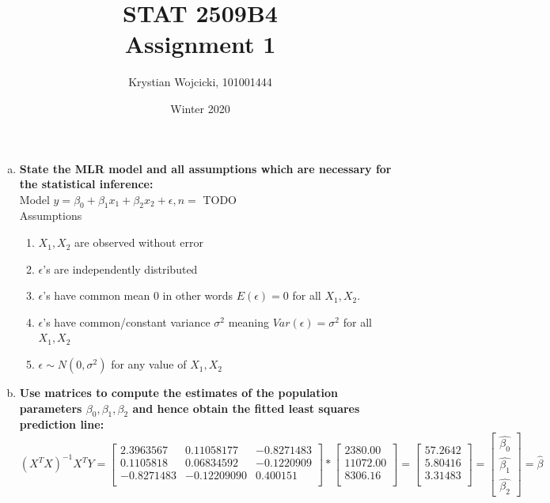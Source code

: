 \documentclass{article}
\title{STAT 2509B4 \\
	\large{Assignment 1}}
\author{Krystian Wojcicki, 101001444}
\date{Winter 2020}
\begin{document}
\maketitle


\begin{enumerate}[(a)]
\item \textbf{State the MLR model and all assumptions which are necessary for the statistical inference: } \\
Model $y = \beta_0 + \beta_1x_1 + \beta_2x_2 + \epsilon, n = $ TODO \\
Assumptions
  \begin{enumerate}[(1)]
   \item $X_1, X_2$ are observed without error
   \item $\epsilon$'s are independently distributed
   \item $\epsilon$'s have common mean 0 in other words $E(\epsilon) = 0$ for all $X_1,X_2$.
   \item $\epsilon$'s have common/constant variance $\sigma^2$ meaning $Var(\epsilon) = \sigma^2$ for all $X_1,X_2$
  \item $\epsilon \sim N(0, \sigma^2)$ for any value of $X_1, X_2$
\end{enumerate}

\item \textbf{Use matrices to compute the estimates of the population parameters $\beta_0,\beta_1,\beta_2$ and hence obtain the fitted least squares prediction line: } \\

$(X^TX)^{-1} X^TY = \begin{bmatrix}
2.3963567 & 0.11058177 & -0.8271483 \\
0.1105818 & 0.06834592 & -0.1220909 \\
-0.8271483 & -0.12209090 & 0.400151 \\
\end{bmatrix} * 
\begin{bmatrix}
2380.00 \\
11072.00 \\
8306.16 \\
\end{bmatrix}= 
\begin{bmatrix}
57.2642 \\
5.80416 \\
3.31483 \\
\end{bmatrix} = 
\begin{bmatrix}
    \hat{\beta_0} \\
    \hat{\beta_1} \\
    \hat{\beta_2}
\end{bmatrix} = \hat{\beta}$



\end{enumerate}
\end{document}
